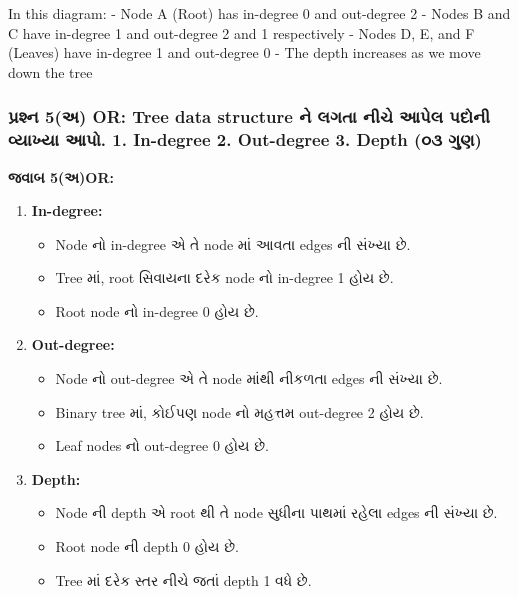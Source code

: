 In this diagram: - Node A (Root) has in-degree 0 and out-degree 2 -
Nodes B and C have in-degree 1 and out-degree 2 and 1 respectively -
Nodes D, E, and F (Leaves) have in-degree 1 and out-degree 0 - The depth
increases as we move down the tree

\hypertarget{uxaaauxab0uxab6uxaa8-5uxa85-or-tree-data-structure-uxaa8-uxab2uxa97uxaa4-uxaa8uxa9a-uxa86uxaaauxab2-uxaaauxaa6uxaa8-uxab5uxaafuxa96uxaaf-uxa86uxaaa.-1.-in-degree-2.-out-degree-3.-depth-uxae6uxae9-uxa97uxaa3}{%
\subsubsection{પ્રશ્ન 5(અ) OR: Tree data structure ને લગતા નીચે આપેલ પદોની
વ્યાખ્યા આપો. 1. In-degree 2. Out-degree 3. Depth (૦૩
ગુણ)}\label{uxaaauxab0uxab6uxaa8-5uxa85-or-tree-data-structure-uxaa8-uxab2uxa97uxaa4-uxaa8uxa9a-uxa86uxaaauxab2-uxaaauxaa6uxaa8-uxab5uxaafuxa96uxaaf-uxa86uxaaa.-1.-in-degree-2.-out-degree-3.-depth-uxae6uxae9-uxa97uxaa3}}

\textbf{જવાબ 5(અ)OR:}

\begin{enumerate}
\def\labelenumi{\arabic{enumi}.}
\tightlist
\item
  \textbf{In-degree:}

  \begin{itemize}
  \tightlist
  \item
    Node નો in-degree એ તે node માં આવતા edges ની સંખ્યા છે.
  \item
    Tree માં, root સિવાયના દરેક node નો in-degree 1 હોય છે.
  \item
    Root node નો in-degree 0 હોય છે.
  \end{itemize}
\item
  \textbf{Out-degree:}

  \begin{itemize}
  \tightlist
  \item
    Node નો out-degree એ તે node માંથી નીકળતા edges ની સંખ્યા છે.
  \item
    Binary tree માં, કોઈપણ node નો મહત્તમ out-degree 2 હોય છે.
  \item
    Leaf nodes નો out-degree 0 હોય છે.
  \end{itemize}
\item
  \textbf{Depth:}

  \begin{itemize}
  \tightlist
  \item
    Node ની depth એ root થી તે node સુધીના પાથમાં રહેલા edges ની સંખ્યા છે.
  \item
    Root node ની depth 0 હોય છે.
  \item
    Tree માં દરેક સ્તર નીચે જતાં depth 1 વધે છે.
  \end{itemize}
\end{enumerate}

